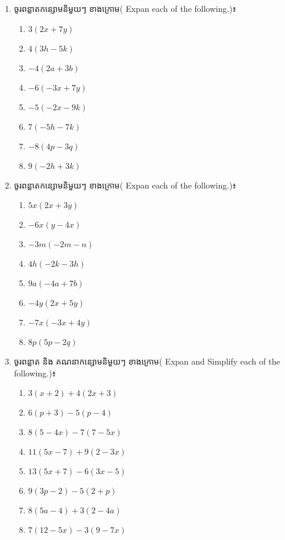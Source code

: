 \newpage
\proa
\begin{enumerate}
\item ចូរពន្លាតកន្សោមនិមួយៗ ខាងក្រោម( Expan each of the following.)៖
\begin{multicols}{4}
\begin{enumerate}[label=\alph*.]
\item $3(2x+7y)$
\item $4(3h-5k)$
\item $-4(2a+3b)$
\item $-6(-3x+7y)$
\item $-5(-2x-9k)$
\item $7(-5h-7k)$
\item $-8(4p-3q)$
\item $9(-2h+3k)$
\end{enumerate}
\end{multicols}

\item  ចូរពន្លាតកន្សោមនិមួយៗ ខាងក្រោម( Expan each of the following.)៖
\begin{multicols}{3}
\begin{enumerate}[label=\alph*.]
\item $5x(2x+3y)$
\item $-6x(y-4x)$
\item $-3m(-2m-n)$
\item $4h(-2k-3h)$
\item $9a(-4a+7b)$
\item $-4y(2x+5y)$
\item $-7x(-3x+4y)$
\item $8p(5p-2q)$
\end{enumerate}
\end{multicols}

\item  ចូរពន្លាត និង គណនាកន្សោមនិមួយៗ ខាងក្រោម( Expan and Simplify  each of the following.)៖
\begin{multicols}{2}
\begin{enumerate}[label=\alph*.]
\item $3(x+2)+4(2x+3)$
\item $6(p+3)-5(p-4)$
\item $8(5-4x)-7(7-5x)$
\item $11(5x-7)+9(2-3x)$
\item $13(5x+7)-6(3x-5)$
\item $9(3p-2)-5(2+p)$
\item $8(5a-4)+3(2-4a)$
\item $7(12-5x)-3(9-7x)$
\end{enumerate}
\end{multicols}


\end{enumerate}
